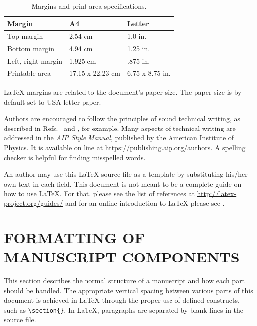 \documentclass[]{spie}  %
\begin{document}
\begin{table}[ht]
\caption{Margins and print area specifications.} 
\label{tab:Paper Margins}
\begin{center}       
\begin{tabular}{|l|l|l|} 
\hline
\rule[-1ex]{0pt}{3.5ex}  Margin & A4 & Letter  \\
\hline
\rule[-1ex]{0pt}{3.5ex}  Top margin & 2.54 cm & 1.0 in.   \\
\hline
\rule[-1ex]{0pt}{3.5ex}  Bottom margin & 4.94 cm & 1.25 in.  \\
\hline
\rule[-1ex]{0pt}{3.5ex}  Left, right margin & 1.925 cm & .875 in.  \\
\hline
\rule[-1ex]{0pt}{3.5ex}  Printable area & 17.15 x 22.23 cm & 6.75 x 8.75 in.  \\
\hline 
\end{tabular}
\end{center}
\end{table}

LaTeX margins are related to the document's paper size. The paper size is by default set to USA letter paper.

Authors are encouraged to follow the principles of sound technical writing, as described in Refs.~ and , for example.  Many aspects of technical writing are addressed in the {\em AIP Style Manual}, published by the American Institute of Physics.  It is available on line at \url{https://publishing.aip.org/authors}. A spelling checker is helpful for finding misspelled words. 

An author may use this LaTeX source file as a template by substituting his/her own text in each field.  This document is not meant to be a complete guide on how to use LaTeX.  For that, please see the list of references at \url{http://latex-project.org/guides/} and for an online introduction to LaTeX please see . 

\section{FORMATTING OF MANUSCRIPT COMPONENTS}

This section describes the normal structure of a manuscript and how each part should be handled.  The appropriate vertical spacing between various parts of this document is achieved in LaTeX through the proper use of defined constructs, such as \verb|\section{}|.  In LaTeX, paragraphs are separated by blank lines in the source file. 
\end{document}
